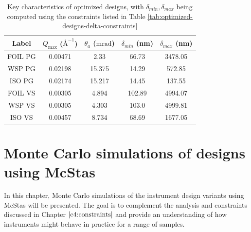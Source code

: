 \documentclass{article}
\begin{document}
\begin{table}[h!]
	\centering
	\begin{tabular}{c | c c c c}
		\toprule
		Label & $Q_{\text{max}}$ ($\text{\AA}^{-1}$) & $\theta_a$ ($\unit{\milli\radian}$) & $\delta_{min}$ (nm) & $\delta_{max}$ (nm) \\
		\midrule
		FOIL PG & 0.00471 & 2.33 & 66.73 & 3478.05 \\
		WSP PG & 0.02198 & 15.375 & 14.29 & 572.85 \\
		ISO PG & 0.02174 & 15.217 & 14.45 & 137.55 \\
		FOIL VS & 0.00305 & 4.894 & 102.89 & 4994.07 \\
		WSP VS & 0.00305 & 4.303 & 103.0 & 4999.81 \\
		ISO VS & 0.00457 & 8.734 & 68.69 & 1677.05 \\
		\bottomrule
	\end{tabular}
	\caption{Key characteristics of optimized designs, with $\delta_{min}, \delta_{max}$ being computed using the constraints listed in Table \ref{tab:optimized-designs-delta-constraints}}
	\label{tab:optimized-designs-performance}
\end{table}






\newpage
\section{Monte Carlo simulations of designs using McStas}
\label{c6:monte-carlo}
In this chapter, Monte Carlo simulations of the instrument design variants using McStas \cite{willendrup2020} will be presented. The goal is to complement the analysis and constraints discussed in Chapter $\ref{c4:constraints}$ and provide an understanding of how instruments might behave in practice for a range of samples. 
\end{document}
